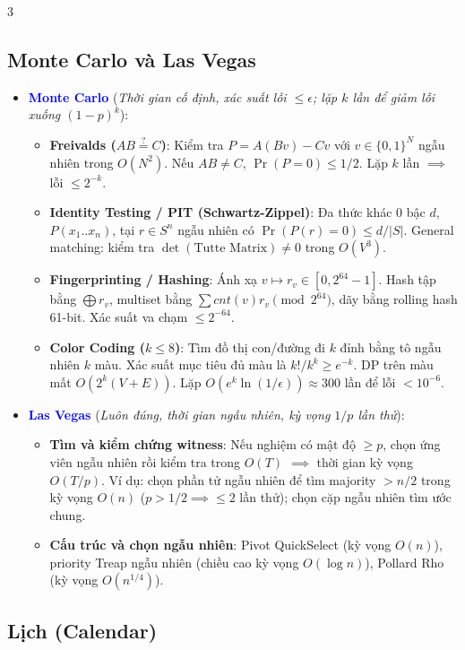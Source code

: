 \documentclass[landscape, 8pt, a4paper, oneside]{extarticle}
\begin{document}
\begin{multicols}{3}
\subsection{Monte Carlo và Las Vegas}
\label{subsec:randomized}
\begin{itemize}
    \item \textcolor{blue}{\textbf{Monte Carlo}} (\textit{Thời gian cố định, xác suất lỗi $\le\epsilon$; lặp $k$ lần để giảm lỗi xuống $(1-p)^k$}):
    \begin{itemize}
        \item \textbf{Freivalds ($AB\stackrel{?}{=}C$)}: Kiểm tra $P=A(Bv)-Cv$ với $v\in\{0,1\}^N$ ngẫu nhiên trong $O(N^2)$. Nếu $AB\ne C$, $\Pr(P=0)\le1/2$. Lặp $k$ lần $\implies$ lỗi $\le2^{-k}$.
        \item \textbf{Identity Testing / PIT (Schwartz-Zippel)}: Đa thức khác 0 bậc $d$, $P(x_1..x_n)$, tại $r\in S^n$ ngẫu nhiên có $\Pr(P(r)=0)\le d/|S|$. General matching: kiểm tra $\det(\text{Tutte Matrix})\ne0$ trong $O(V^3)$.
        \item \textbf{Fingerprinting / Hashing}: Ánh xạ $v\mapsto r_v\in[0,2^{64}-1]$. Hash tập bằng $\bigoplus r_v$, multiset bằng $\sum cnt(v)r_v\pmod{2^{64}}$, dãy bằng rolling hash 61-bit. Xác suất va chạm $\le2^{-64}$.
        \item \textbf{Color Coding ($k\le8$)}: Tìm đồ thị con/đường đi $k$ đỉnh bằng tô ngẫu nhiên $k$ màu. Xác suất mục tiêu đủ màu là $k!/k^k\ge e^{-k}$. DP trên màu mất $O(2^k(V+E))$. Lặp $O(e^k\ln(1/\epsilon))\approx300$ lần để lỗi $<10^{-6}$.
    \end{itemize}
    \item \textcolor{blue}{\textbf{Las Vegas}} (\textit{Luôn đúng, thời gian ngẫu nhiên, kỳ vọng $1/p$ lần thử}):
    \begin{itemize}
        \item \textbf{Tìm và kiểm chứng witness}: Nếu nghiệm có mật độ $\ge p$, chọn ứng viên ngẫu nhiên rồi kiểm tra trong $O(T)$ $\implies$ thời gian kỳ vọng $O(T/p)$. Ví dụ: chọn phần tử ngẫu nhiên để tìm majority $>n/2$ trong kỳ vọng $O(n)$ ($p>1/2\implies\le2$ lần thử); chọn cặp ngẫu nhiên tìm ước chung.
        \item \textbf{Cấu trúc và chọn ngẫu nhiên}: Pivot QuickSelect (kỳ vọng $O(n)$), priority Treap ngẫu nhiên (chiều cao kỳ vọng $O(\log n)$), Pollard Rho (kỳ vọng $O(n^{1/4})$).
    \end{itemize}
\end{itemize}

\subsection{Lịch (Calendar)}
\inputminted[]{cpp}{source/cpp/utility/calendar.cpp}


\end{multicols}
\end{document}
